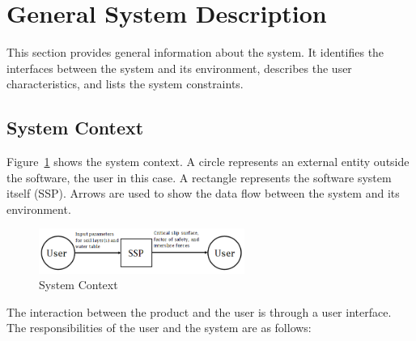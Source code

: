 \documentclass[12pt]{article}
\newcommand{\progname}{SSP}
\begin{document}

\section{General System Description}

This section provides general information about the system. It identifies the 
interfaces between the system and its environment, describes the user 
characteristics, and lists the system constraints.

\subsection{System Context}

Figure~\ref{Fig_SystemContext} shows the system context.  A circle represents an
external entity outside the software, the user in this case.  A rectangle
represents the software system itself (\progname).  Arrows are used to show the 
data flow between the system and its environment.

\begin{figure}[h!]
	\begin{center}
		\includegraphics[width=0.6\textwidth]{SystemContextFigure.png}
		\caption{System Context}
		\label{Fig_SystemContext}
	\end{center}
\end{figure}

\noindent The interaction between the product and the user is through a user
interface.  The responsibilities of the user and the system are as follows:
\end{document}
